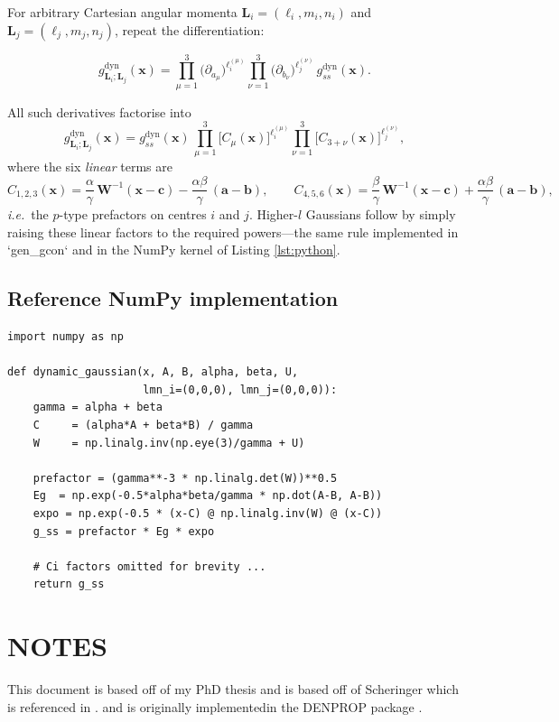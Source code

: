 \documentclass{article}
\newcommand*\expa{\alpha}
\newcommand*\expb{\beta}
\newcommand*\expab{\gamma}           %
\newcommand*\veca{\bm a}
\newcommand*\vecb{\bm b}
\newcommand*\vecc{\bm c}
\newcommand*\matW{\bm W}             %
\newcommand*\dx[1]{\partial_{#1}}
\begin{document}
For arbitrary Cartesian angular momenta
$\bm L_i\!=\!(\ell_i,m_i,n_i)$ and $\bm L_j\!=\!(\ell_j,m_j,n_j)$,
repeat the differentiation:

\[
  g_{\bm L_i;\bm L_j}^{\text{dyn}}(\bm x)=
    \prod_{\mu=1}^{3}\bigl(\dx{a_\mu}\bigr)^{\ell_i^{(\mu)}}
    \prod_{\nu=1}^{3}\bigl(\dx{b_\nu}\bigr)^{\ell_j^{(\nu)}}
    \,g_{ss}^{\text{dyn}}(\bm x).
\]

All such derivatives factorise into
\[
  g_{\bm L_i;\bm L_j}^{\text{dyn}}(\bm x)=
     g_{ss}^{\text{dyn}}(\bm x)\,
     \prod_{\mu=1}^{3}\bigl[C_{\mu}(\bm x)\bigr]^{\ell_i^{(\mu)}}
     \prod_{\nu=1}^{3}\bigl[C_{3+\nu}(\bm x)\bigr]^{\ell_j^{(\nu)}},
\]
where the six \emph{linear} terms are
\[
  C_{1,2,3}(\bm x)=
    \frac{\expa}{\expab}\,\matW^{-1}(\bm x-\vecc)
    -\frac{\expa\expb}{\expab}\,(\veca-\vecb),
\qquad
  C_{4,5,6}(\bm x)=
    \frac{\expb}{\expab}\,\matW^{-1}(\bm x-\vecc)
    +\frac{\expa\expb}{\expab}\,(\veca-\vecb),
\]
\emph{i.e.}\ the $p$-type prefactors on centres $i$ and $j$.
Higher-$l$ Gaussians follow by simply raising these linear factors to the
required powers—the same rule implemented in
`gen\_gcon` and in the NumPy kernel of
Listing \ref{lst:python}.


\subsection{Reference NumPy implementation}

\begin{lstlisting}[caption={Vectorised NumPy kernel matching Eq. (10)},
                   label={lst:python}]
import numpy as np

def dynamic_gaussian(x, A, B, alpha, beta, U,
                     lmn_i=(0,0,0), lmn_j=(0,0,0)):
    gamma = alpha + beta
    C     = (alpha*A + beta*B) / gamma
    W     = np.linalg.inv(np.eye(3)/gamma + U)

    prefactor = (gamma**-3 * np.linalg.det(W))**0.5
    Eg  = np.exp(-0.5*alpha*beta/gamma * np.dot(A-B, A-B))
    expo = np.exp(-0.5 * (x-C) @ np.linalg.inv(W) @ (x-C))
    g_ss = prefactor * Eg * expo

    # Ci factors omitted for brevity ...
    return g_ss
\end{lstlisting}



\section*{NOTES}
This document is based off of my PhD thesis \cite{MichaelPhD2013} and is
based off of Scheringer \cite{Scheringer1976} which is referenced in
\cite{Michael2015JMC}.
and is originally implementedin the DENPROP package \cite{DENPROP}.
\end{document}
